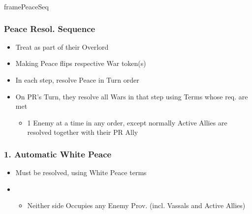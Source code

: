 \documentclass[10pt]{article}
\newlength{\fhPeaceSeq} \setlength\fhPeaceSeq{32\baselineskip}
\begin{document}
\begin{dynamiccontents*}{framePeaceSeq}\begin{eubox}{\fhPeaceSeq}
	\begin{multicols}{2}
		\subsubsection*{Peace Resol. Sequence }
		\begin{itemize}
			\item Treat  as part of their Overlord
			\item Making Peace flips respective War token(s)
			\item In each step, resolve Peace in Turn order
			\item On PR's Turn, they resolve all Wars in that step using Terms whose req. are met
			\begin{itemize}
				\item 1 Enemy at a time in any order, except normally Active Allies are resolved together with their PR Ally 
			\end{itemize}
		\end{itemize}

		\subsubsection*{1. Automatic White Peace}
		\begin{itemize}
			\item Must be resolved, using White Peace terms
			\item {}
			\begin{itemize}
				\item Neither side Occupies any Enemy Prov. (incl. Vassals and Active Allies)
			\end{itemize}
		\end{itemize}


\end{multicols}
\end{eubox}
\end{dynamiccontents*}
\end{document}

